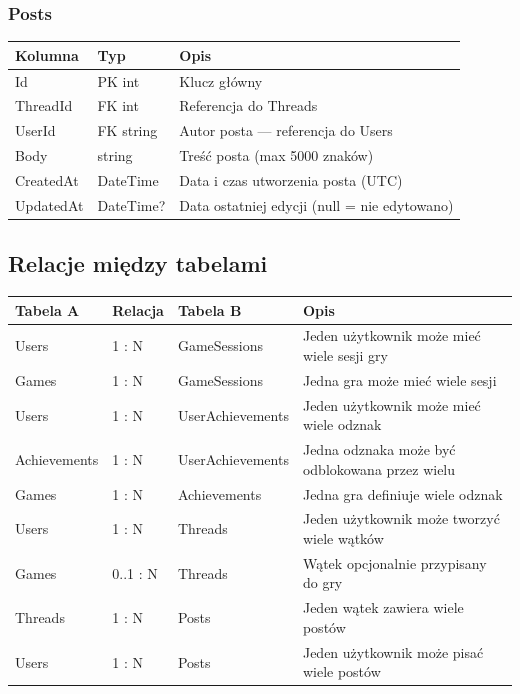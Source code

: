 \documentclass[12pt,a4paper]{article}
\begin{document}
\subsubsection{Posts}

\begin{longtable}{>{\ttfamily}p{3.5cm} p{3cm} p{7cm}}
  \toprule
  \normalfont\textbf{Kolumna} & \textbf{Typ} & \textbf{Opis} \\
  \midrule
  \endhead
  Id        & PK int    & Klucz główny \\[3pt]
  ThreadId  & FK int    & Referencja do Threads \\[3pt]
  UserId    & FK string & Autor posta --- referencja do Users \\[3pt]
  Body      & string    & Treść posta (max 5000 znaków) \\[3pt]
  CreatedAt & DateTime  & Data i czas utworzenia posta (UTC) \\[3pt]
  UpdatedAt & DateTime? & Data ostatniej edycji (null = nie edytowano) \\
  \bottomrule
\end{longtable}

\subsection{Relacje między tabelami}

\begin{longtable}{p{3.5cm} p{2.5cm} p{3.5cm} p{5cm}}
  \toprule
  \textbf{Tabela A} & \textbf{Relacja} & \textbf{Tabela B} & \textbf{Opis} \\
  \midrule
  \endhead
  Users        & 1 : N    & GameSessions    & Jeden użytkownik może mieć wiele sesji gry \\[3pt]
  Games        & 1 : N    & GameSessions    & Jedna gra może mieć wiele sesji \\[3pt]
  Users        & 1 : N    & UserAchievements & Jeden użytkownik może mieć wiele odznak \\[3pt]
  Achievements & 1 : N    & UserAchievements & Jedna odznaka może być odblokowana przez wielu \\[3pt]
  Games        & 1 : N    & Achievements    & Jedna gra definiuje wiele odznak \\[3pt]
  Users        & 1 : N    & Threads         & Jeden użytkownik może tworzyć wiele wątków \\[3pt]
  Games        & 0..1 : N & Threads         & Wątek opcjonalnie przypisany do gry \\[3pt]
  Threads      & 1 : N    & Posts           & Jeden wątek zawiera wiele postów \\[3pt]
  Users        & 1 : N    & Posts           & Jeden użytkownik może pisać wiele postów \\
  \bottomrule
\end{longtable}
\end{document}
